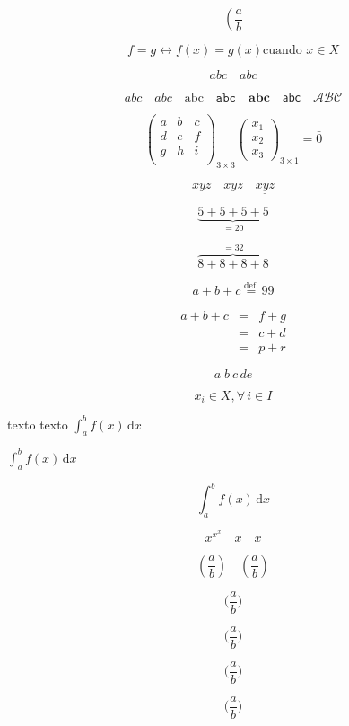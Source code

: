 \documentclass{report}
\begin{document}
\[
\left(\frac{a}{b}\right.
\]

\[
f=g \leftrightarrow f(x)=g(x) \mbox{cuando }x\in X
\]


\[
abc\quad \mathit{abc}
\]

\[
abc\quad \mathit{abc}\quad \mathrm{abc}\quad\mathtt{abc}\quad\mathbf{abc}\quad\mathsf{abc}\quad\mathcal{ABC}
\]

\[
\left(
\begin{array}{ccc}
a & b & c \\
d & e & f \\
g & h & i \\
\end{array}
\right)_{3\times3}
\left(
\begin{array}{c}
x_1 \\
x_2 \\
x_3
\end{array}
\right)_{3\times1}=\bar{0}
\]

\newpage

\[
\bar{xyz}\quad \overline{xyz}\quad\underline{xyz}
\]


\[
\underbrace{5+5+5+5}_{=20}
\]

\[
\overbrace{8+8+8+8}^{=32}
\]

\[
a+b+c\stackrel{\mathrm{def.}}{=}99
\]

\begin{eqnarray}
a + b + c &=& f+g\\
		&=& c + d\nonumber\\%
		&=& p +r%
\end{eqnarray}%


\[
a\; b\: c\, d\! e
\]

\[
x_i\in X,\forall\, i\in I
\]


texto texto $\int_{a}^{b}f(x)\,\mathrm{d}x$

$\displaystyle\int_{a}^{b}f(x)\,\mathrm{d}x$

\[
\textstyle\int_{a}^{b}f(x)\,\mathrm{d}x
\]

\[
x^{x^{x}}\quad\scriptstyle{x}\quad\scriptscriptstyle{x}
\]


\[
(\frac{a}{b})\quad\left(
\frac{a}{b}
\right)
\]

\[
\big(\frac{a}{b}\big)
\]

\[
\Big(\frac{a}{b}\Big)
\]

\[
\bigg(\frac{a}{b}\bigg)
\]

\[
\Bigg(\frac{a}{b}\Bigg)
\]
\end{document}
